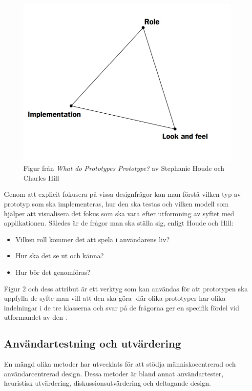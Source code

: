 \begin{figure}[H]
  \centering
  \includegraphics[scale=0.9]{resources/Prototyp.jpg}
  \centering
  \captionsetup{justification=centering, margin=2cm}
  \caption{Figur från \textit{What do Prototypes Prototype?} av Stephanie Houde och Charles Hill
 \cite{HoudeWhatPrototype} }
\end{figure}

Genom att explicit fokusera på vissa designfrågor kan man förstå vilken typ av prototyp som ska implementeras, hur den ska testas och vilken modell som hjälper att visualisera det fokus som ska vara efter utformning av syftet med applikationen\cite{HoudeWhatPrototype}. Således är de frågor man ska ställa sig, enligt Houde och Hill\cite{HoudeWhatPrototype}: 
\begin{itemize}
\item Vilken roll kommer det att spela i användarens liv?
\item Hur ska det se ut och känna? 
\item Hur bör det genomföras?
\end{itemize}

 Figur 2 och dess attribut är ett verktyg som kan användas för att prototypen ska uppfylla de syfte man vill att den ska göra -där olika prototyper har olika indelningar i de tre klasserna och svar på de frågorna ger en specifik fördel vid utformandet av den \cite{HoudeWhatPrototype}.


\subsection{Användartestning och utvärdering}
En mängd olika metoder har utvecklats för att stödja människocentrerad och användarcentrerad design\cite{Abras2004User-CenteredDesign}. Dessa metoder är bland annat användartester, heuristisk utvärdering, diskussionsutvärdering och deltagande design. 
\newline

